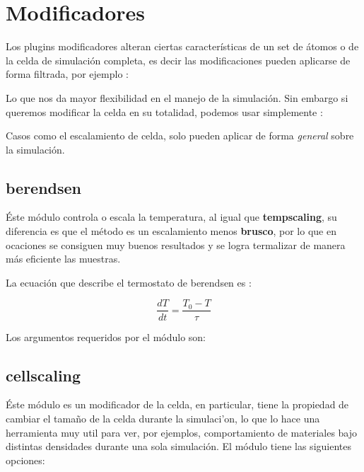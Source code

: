 \section{Modificadores}

Los plugins modificadores alteran ciertas caracter\'isticas de un set de \'atomos o de la celda de simulaci\'on completa, es decir las modificaciones pueden aplicarse de forma filtrada, por ejemplo :


Lo que nos da mayor flexibilidad en el manejo de la simulaci\'on. Sin embargo si queremos modificar la celda en su totalidad, podemos usar simplemente :


Casos como el escalamiento de celda, solo pueden aplicar de forma \textit{general} sobre la simulaci\'on.

\subsection{berendsen}
\'Este m\'odulo controla o escala la temperatura, al igual que \textbf{tempscaling}, su diferencia es que el m\'etodo es un escalamiento menos \textbf{brusco}, por lo que en ocaciones se consiguen muy buenos resultados y se logra termalizar de manera m\'as eficiente las muestras. 

La ecuaci\'on que describe el termostato de berendsen es :

$$\frac{dT}{dt} = \frac{T_0 - T}{\tau}$$

Los argumentos requeridos por el m\'odulo son:


\subsection{cellscaling}
\'Este m\'odulo es un modificador de la celda, en particular, tiene la propiedad de cambiar el tama\~no de la celda durante la simulaci'on, lo que lo hace una herramienta muy util para ver, por ejemplos, comportamiento de materiales bajo distintas densidades durante una sola simulaci\'on. El m\'odulo tiene las siguientes opciones:

